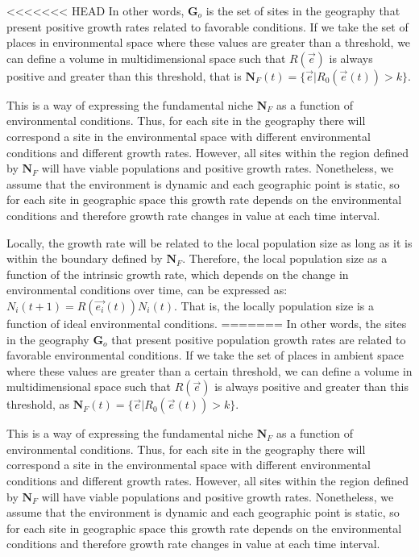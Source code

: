 \documentclass[
]{article}
\begin{document}
<<<<<<< HEAD
In other words, \(\mathbf{G}_o\) is the set of sites in the geography
that present positive growth rates related to favorable conditions. If
we take the set of places in environmental space where these values are
greater than a threshold, we can define a volume in multidimensional
space such that \(R(\vec{e})\) is always positive and greater than this
threshold, that is
\(\mathbf{N}_F(t) = \{\vec{e} | R_0(\vec{e}(t)) > k \}\).

This is a way of expressing the fundamental niche \(\mathbf{N}_F\) as a
function of environmental conditions. Thus, for each site in the
geography there will correspond a site in the environmental space with
different environmental conditions and different growth rates. However,
all sites within the region defined by \(\mathbf{N}_F\) will have viable
populations and positive growth rates. Nonetheless, we assume that the
environment is dynamic and each geographic point is static, so for each
site in geographic space this growth rate depends on the environmental
conditions and therefore growth rate changes in value at each time
interval.

Locally, the growth rate will be related to the local population size as
long as it is within the boundary defined by \(\mathbf{N}_F\).
Therefore, the local population size as a function of the intrinsic
growth rate, which depends on the change in environmental conditions
over time, can be expressed as: \(N_i(t+1) = R(\vec{e_i}(t) ) N_i(t)\).
That is, the locally population size is a function of ideal
environmental conditions.
=======
In other words, the sites in the geography \(\mathbf{G}_o\) that present
positive population growth rates are related to favorable environmental conditions. If we take
the set of places in ambient space where these values are greater than a
certain threshold, we can define a volume in multidimensional space such that
\(R(\vec{e})\) is always positive and greater than this threshold, as \(\mathbf{N}_F(t) = \{\vec{e} | R_0(\vec{e}(t)) > k \}\).

This is a way of expressing the fundamental niche \(\mathbf{N}_F\) as a function of
environmental conditions. Thus, for each site in the geography there will
correspond a site in the environmental space with different
environmental conditions and different growth rates. However, all sites
within the region defined by \(\mathbf{N}_F\) will have viable
populations and positive growth rates. Nonetheless, we assume that the environment
is dynamic and each geographic point is static, so for each site in
geographic space this growth rate depends on the environmental conditions and
therefore growth rate changes in value at each time interval.
\end{document}
